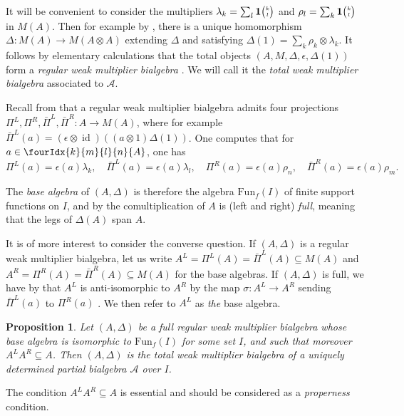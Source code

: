 \documentclass[10pt]{article}
\DeclareMathOperator{\id}{id}
\newcommand{\Fun}{\mathrm{Fun}}
\newcommand{\Grt}[3]{#1{\tiny {\begin{pmatrix} #2\\#3\end{pmatrix}}}}
\newcommand{\UnitC}[2]{\Grt{\mathbf{1}}{#1}{#2}}
\newcommand{\Gr}[5]{\fourIdx{#2}{#4}{#3}{#5}{#1}}%
\newtheorem{Prop}[Theorem]{Proposition}
\theoremstyle{definition}
\numberwithin{equation}{section}
\begin{document}
It will be convenient to consider the multipliers $\lambda_k = \sum_l \UnitC{k}{l}$ and $\rho_l = \sum_k\UnitC{k}{l}$ in $M(A)$. Then for example by \cite[Proposition A.3]{VDW2}, there is a unique homomorphism $\Delta:M(A)\rightarrow M(A\otimes A)$ extending $\Delta$ and satisfying $\Delta(1) = \sum_k \rho_k\otimes \lambda_k$. It follows by elementary calculations that the total objects $(A,M,\Delta,\epsilon,\Delta(1))$ form a \emph{regular weak multiplier bialgebra} \cite[Definition 2.1 and Definition 2.3]{Boh1}. We will call it the \emph{total weak multiplier bialgebra} associated to $\mathscr{A}$.

Recall from \cite[Section 3]{Boh1} that a regular weak multiplier
bialgebra admits four projections $\Pi^L,\Pi^R,\bar{\Pi}^L,\bar{\Pi}^R:A\rightarrow M(A)$, where for example  $\bar{\Pi}^L(a) = (\epsilon\otimes \id)((a\otimes
  1)\Delta(1))$. One computes that for $a\in \Gr{A}{k}{l}{m}{n}$, one has \[ \Pi^L(a) = \epsilon(a)\lambda_k,\quad \bar{\Pi}^L(a) = \epsilon(a) \lambda_l, \quad \Pi^R(a) = \epsilon(a) \rho_n,\quad \bar{\Pi}^R(a) = \epsilon(a)\rho_m.\]

The \emph{base algebra} of $(A,\Delta)$ is therefore the algebra $\Fun_{f}(I)$ of finite support functions on $I$, and by \cite[Theorem 3.13]{Boh1} the comultiplication of $A$ is (left and right) \emph{full}, meaning that the legs of $\Delta(A)$ span $A$.

It is of more interest to consider the converse question. If $(A,\Delta)$ is a regular weak multiplier bialgebra, let us write $A^L = \Pi^L(A) = \bar{\Pi}^L(A)\subseteq M(A)$ and $A^R = \Pi^R(A)= \bar{\Pi}^R(A)\subseteq M(A)$ for the base algebras. If  $(A,\Delta)$ is full, we have by \cite[Lemma 4.8]{Boh1} that $A^L$ is anti-isomorphic to $A^R$ by the map $\sigma: A^L \rightarrow A^R$ sending $\bar{\Pi}^L(a)$ to $\Pi^R(a)$ . We then refer to $A^L$ as \emph{the} base algebra.

\begin{Prop}\label{PropCharPBA} Let $(A,\Delta)$ be a full regular weak multiplier bialgebra whose base algebra is isomorphic to $\Fun_f(I)$ for some set $I$, and such that moreover $A^LA^R \subseteq A$. Then $(A,\Delta)$ is the total weak multiplier bialgebra of a uniquely determined partial bialgebra $\mathscr{A}$ over $I$.
\end{Prop} 

The condition $A^LA^R \subseteq A$ is essential and should be considered as a \emph{properness} condition. %
\end{document}

